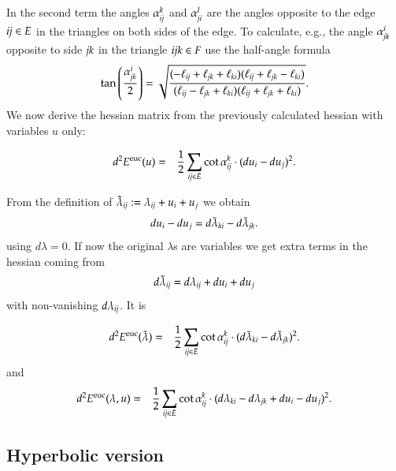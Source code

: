 \documentclass[Thesis]{subfiles}
\begin{document}
In the second term the angles $\alpha_{\it ij}^k$ and $\alpha_{\it ji}^l$ are the angles opposite to the edge $\it ij\in E$ in the 
triangles on both sides of the edge. To calculate, e.g., the angle $ \alpha_{\it jk}^i$ opposite to side $\it jk$ in the triangle $\it ijk \in F$ use the half-angle formula
\[\tan\left(\frac{ \alpha_{\it jk}^i}{2}\right) = \sqrt{\frac
{(-\ell_{\it ij} +\ell_{\it jk} +\ell_{\it ki})(\ell_{\it ij} +\ell_{\it jk} -\ell_{\it ki})}
{(\ell_{\it ij} -\ell_{\it jk} +\ell_{\it ki})(\ell_{\it ij} + \ell_{\it jk} +\ell_{\it ki})}}.\]
We now derive the hessian matrix from the previously calculated hessian with variables $u$ only:

\begin{eqnarray}
d^2E^{\rm euc}(u)&=&\frac{1}{2}\sum_{\it ij \in \bar E} \cot  \alpha_{\it ij}^k \cdot (du_i - du_j)^2.
\end{eqnarray}

From the definition of $\tilde\lambda_{\it ij} := \lambda_{\it ij}+u_i+u_j$ we obtain
\[du_i-du_j=d\tilde\lambda_{\it ki}-d\tilde\lambda_{\it jk}.\]
using $d\lambda = 0$. If now the original $\lambda$s are variables we get extra terms in the hessian coming from 
\[d\tilde\lambda_{\it ij}=d\lambda_{\it ij}+du_i+du_j\]
with non-vanishing $d\lambda_{\it ij}$. It is

\begin{eqnarray*}
d^2E^{\rm euc}(\tilde\lambda)
&=&\frac{1}{2}\sum_{\it ij \in \bar E} \cot  \alpha_{\it ij}^k \cdot (d\tilde\lambda_{\it ki}-d\tilde\lambda_{\it jk})^2.
\end{eqnarray*}
and
\begin{eqnarray*}
d^2E^{\rm euc}(\lambda, u)&=&\frac{1}{2}\sum_{\it ij \in \bar E} \cot  \alpha_{\it ij}^k \cdot (d\lambda_{\it ki}-d\lambda_{\it jk} + du_i - du_j)^2.
\end{eqnarray*}

\subsection{Hyperbolic version}
\end{document}

